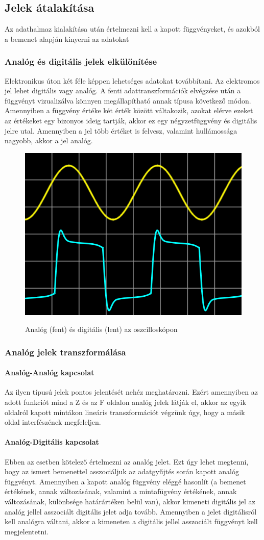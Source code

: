 \subsection{Jelek átalakítása}
Az adathalmaz kialakítása után értelmezni kell a kapott függvényeket, és azokból a bemenet alapján kinyerni az adatokat
\subsubsection{Analóg és digitális jelek elkülönítése}
Elektronikus úton két féle képpen lehetséges adatokat továbbítani. Az elektromos jel lehet digitális vagy analóg. A fenti adattranszformációk elvégzése után a függvényt vizualizálva könnyen megállapítható annak típusa következő módon. Amennyiben a függvény értéke két érték között váltakozik, azokat elérve ezeket az értékeket egy bizonyos ideig tartják, akkor ez egy négyzetfüggvény és digitális jelre utal. Amennyiben a jel több értéket is felvesz, valamint hullámossága nagyobb, akkor a jel analóg.

\begin{figure}[H]
	\centering
	\includegraphics[width=0.5\linewidth]{img/oszcilloskóp.png}
    \cite{digital_vs_analog}
	\caption{Analóg (fent) és digitális (lent) az oszcilloskópon}
	\label{fig:oscilloszkop}
\end{figure}

\subsubsection{Analóg jelek transzformálása}
\paragraph{Analóg-Analóg kapcsolat}
Az ilyen típusú jelek pontos jelentését nehéz meghatározni. Ezért amennyiben az adott funkciót mind a Z és az F oldalon analóg jelek látják el, akkor az egyik oldalról kapott mintákon lineáris transzformációt végzünk úgy, hogy a másik oldal interfészének megfeleljen.
\paragraph{Analóg-Digitális kapcsolat}
Ebben az esetben kötelező értelmezni az analóg jelet. Ezt úgy lehet megtenni, hogy az ismert bemenettel asszociáljuk az adatgyűjtés során kapott analóg függvényt. Amennyiben a kapott analóg függvény eléggé hasonlít (a bemenet értékének, annak változásának, valamint a mintafügvény értékének, annak változásának, különbsége határártéken belül van), akkor kimeneti digitális jel az analóg jellel asszociált digitális jelet adja tovább. Amennyiben a jelet digitálisról kell analógra váltani, akkor a kimeneten a digitális jellel asszociált függvényt kell megjelentetni.

